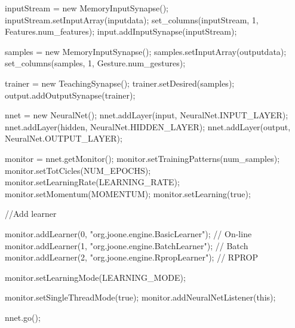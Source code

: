 \documentclass[12pt,a4,notitlepage]{report}
\renewcommand{\_}{\texttt{\symbol{95}}}
\newcommand{\<}{\texttt{\symbol{60}}}
\renewcommand{\>}{\texttt{\symbol{62}}}
\begin{document}
\begin{code}
{{      inputStream = new MemoryInputSynapse();
      inputStream.setInputArray(inputdata);
      set_columns(inputStream, 1, Features.num_features);
      input.addInputSynapse(inputStream);

      samples = new MemoryInputSynapse();
      samples.setInputArray(outputdata);
      set_columns(samples, 1, Gesture.num_gestures);
         
      trainer = new TeachingSynapse();
      trainer.setDesired(samples);
      output.addOutputSynapse(trainer);
         
      nnet = new NeuralNet();
      nnet.addLayer(input, NeuralNet.INPUT_LAYER);
      nnet.addLayer(hidden, NeuralNet.HIDDEN_LAYER);
      nnet.addLayer(output, NeuralNet.OUTPUT_LAYER);
      
      monitor = nnet.getMonitor();
      monitor.setTrainingPatterns(num_samples);
      monitor.setTotCicles(NUM_EPOCHS);
      monitor.setLearningRate(LEARNING_RATE);
      monitor.setMomentum(MOMENTUM);
      monitor.setLearning(true);
      
      //Add learner
      
      monitor.addLearner(0, "org.joone.engine.BasicLearner"); // On-line
      monitor.addLearner(1, "org.joone.engine.BatchLearner"); // Batch
      monitor.addLearner(2, "org.joone.engine.RpropLearner"); // RPROP
      
      monitor.setLearningMode(LEARNING_MODE);
            
      monitor.setSingleThreadMode(true);
      monitor.addNeuralNetListener(this);
         
      nnet.go();
   }
}
\end{code}
\end{document}
